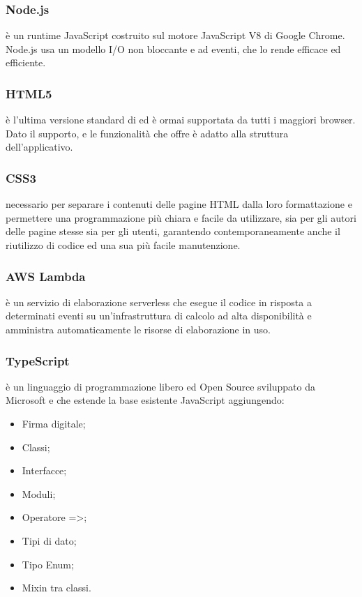 \documentclass[../NormeDiProgetto.tex]{subfiles}
\begin{document}
            \subsubsection{Node.js}
             è un runtime JavaScript costruito sul motore JavaScript V8 di Google Chrome. Node.js usa un modello I/O non bloccante e ad eventi, che lo rende efficace ed efficiente.
            
            \subsubsection{HTML5}
             è l'ultima versione standard di  ed è ormai supportata da tutti i maggiori browser. Dato il supporto, e le funzionalità che offre è adatto alla struttura dell'applicativo.
            
            \subsubsection{CSS3}
             necessario per separare i contenuti delle pagine HTML dalla loro formattazione e permettere una programmazione più chiara e facile da utilizzare, sia per gli autori delle pagine stesse sia per gli utenti, garantendo contemporaneamente anche il riutilizzo di codice ed una sua più facile manutenzione.

            \subsubsection{AWS Lambda}
             è un servizio di elaborazione serverless che esegue il codice in risposta a determinati eventi su un'infrastruttura di calcolo ad alta disponibilità e amministra automaticamente le risorse di elaborazione in uso.

            \subsubsection{TypeScript}
             è un linguaggio di programmazione libero ed Open Source sviluppato da Microsoft e che estende la base esistente JavaScript aggiungendo:
                  \begin{itemize}
                        \item Firma digitale;
                        \item Classi;
                        \item Interfacce;
                        \item Moduli;
                        \item Operatore =>;
                        \item Tipi di dato;
                        \item Tipo Enum;
                        \item Mixin tra classi.
                  \end{itemize}
\end{document}
